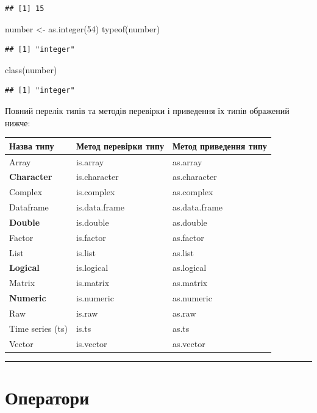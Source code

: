 \documentclass[
]{book}
\newenvironment{Shaded}{\begin{snugshade}}{\end{snugshade}}
\newcommand{\DecValTok}[1]{\textcolor[rgb]{0.00,0.00,0.81}{#1}}
\newcommand{\FunctionTok}[1]{\textcolor[rgb]{0.00,0.00,0.00}{#1}}
\newcommand{\NormalTok}[1]{#1}
\newcommand{\OtherTok}[1]{\textcolor[rgb]{0.56,0.35,0.01}{#1}}
\begin{document}
\begin{verbatim}
## [1] 15
\end{verbatim}

\begin{Shaded}
\begin{Highlighting}[]
\NormalTok{number }\OtherTok{\textless{}{-}} \FunctionTok{as.integer}\NormalTok{(}\DecValTok{54}\NormalTok{)}
\FunctionTok{typeof}\NormalTok{(number)}
\end{Highlighting}
\end{Shaded}

\begin{verbatim}
## [1] "integer"
\end{verbatim}

\begin{Shaded}
\begin{Highlighting}[]
\FunctionTok{class}\NormalTok{(number)}
\end{Highlighting}
\end{Shaded}

\begin{verbatim}
## [1] "integer"
\end{verbatim}

Повний перелік типів та методів перевірки і приведення їх типів ображений нижче:

\begin{longtable}[]{@{}lll@{}}
\toprule
Назва типу & Метод перевірки типу & Метод приведення типу\tabularnewline
\midrule
\endhead
Array & is.array & as.array\tabularnewline
\textbf{Character} & is.character & as.character\tabularnewline
Complex & is.complex & as.complex\tabularnewline
Dataframe & is.data.frame & as.data.frame\tabularnewline
\textbf{Double} & is.double & as.double\tabularnewline
Factor & is.factor & as.factor\tabularnewline
List & is.list & as.list\tabularnewline
\textbf{Logical} & is.logical & as.logical\tabularnewline
Matrix & is.matrix & as.matrix\tabularnewline
\textbf{Numeric} & is.numeric & as.numeric\tabularnewline
Raw & is.raw & as.raw\tabularnewline
Time series (ts) & is.ts & as.ts\tabularnewline
Vector & is.vector & as.vector\tabularnewline
\bottomrule
\end{longtable}

\begin{center}\rule{0.5\linewidth}{0.5pt}\end{center}

\hypertarget{chapter23}{%
\section{Оператори}\label{chapter23}}
\end{document}
